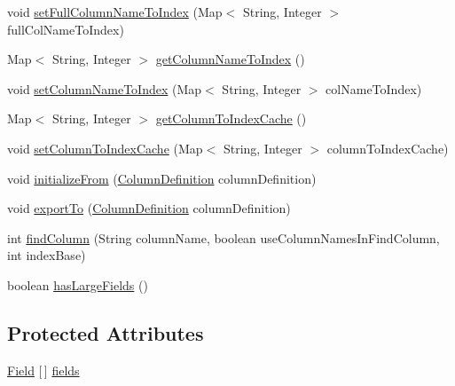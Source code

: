 \begin{DoxyCompactItemize}
\item 
void \mbox{\hyperlink{classcom_1_1mysql_1_1cj_1_1result_1_1_default_column_definition_ae2045059ad696f24e150f350d78bf78f}{set\+Full\+Column\+Name\+To\+Index}} (Map$<$ String, Integer $>$ full\+Col\+Name\+To\+Index)
\item 
Map$<$ String, Integer $>$ \mbox{\hyperlink{classcom_1_1mysql_1_1cj_1_1result_1_1_default_column_definition_a0062f342092aed8730976bb8d3cb1a83}{get\+Column\+Name\+To\+Index}} ()
\item 
void \mbox{\hyperlink{classcom_1_1mysql_1_1cj_1_1result_1_1_default_column_definition_ab28ab9fcc3e8ca10cbc6c0bc511efa29}{set\+Column\+Name\+To\+Index}} (Map$<$ String, Integer $>$ col\+Name\+To\+Index)
\item 
Map$<$ String, Integer $>$ \mbox{\hyperlink{classcom_1_1mysql_1_1cj_1_1result_1_1_default_column_definition_a76daa3a615b1036aafa51dc1c02d2cba}{get\+Column\+To\+Index\+Cache}} ()
\item 
void \mbox{\hyperlink{classcom_1_1mysql_1_1cj_1_1result_1_1_default_column_definition_a8c6cb26318321620cc702e53a480d28f}{set\+Column\+To\+Index\+Cache}} (Map$<$ String, Integer $>$ column\+To\+Index\+Cache)
\item 
void \mbox{\hyperlink{classcom_1_1mysql_1_1cj_1_1result_1_1_default_column_definition_a3f43ae53d1b938644d8c737c2ab07940}{initialize\+From}} (\mbox{\hyperlink{interfacecom_1_1mysql_1_1cj_1_1protocol_1_1_column_definition}{Column\+Definition}} column\+Definition)
\item 
void \mbox{\hyperlink{classcom_1_1mysql_1_1cj_1_1result_1_1_default_column_definition_a9997f7a2813bccae2ad368156b7b3cbc}{export\+To}} (\mbox{\hyperlink{interfacecom_1_1mysql_1_1cj_1_1protocol_1_1_column_definition}{Column\+Definition}} column\+Definition)
\item 
int \mbox{\hyperlink{classcom_1_1mysql_1_1cj_1_1result_1_1_default_column_definition_ae73bfdbb03fe73c3a9b7687e4e987500}{find\+Column}} (String column\+Name, boolean use\+Column\+Names\+In\+Find\+Column, int index\+Base)
\item 
boolean \mbox{\hyperlink{classcom_1_1mysql_1_1cj_1_1result_1_1_default_column_definition_a221996852cd52bf81bd9e3ecb8ab6ff5}{has\+Large\+Fields}} ()
\end{DoxyCompactItemize}
\subsection*{Protected Attributes}
\begin{DoxyCompactItemize}
\item 
\mbox{\hyperlink{classcom_1_1mysql_1_1cj_1_1result_1_1_field}{Field}} \mbox{[}$\,$\mbox{]} \mbox{\hyperlink{classcom_1_1mysql_1_1cj_1_1result_1_1_default_column_definition_a3f4d762bd95f857062625fddb3a02102}{fields}}
\end{DoxyCompactItemize}


